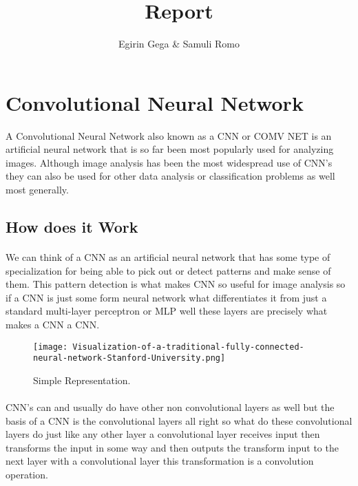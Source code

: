 \documentclass{article}
\title{Report}
\author{Egirin Gega \&  Samuli Romo}
\begin{document}
  \maketitle

  \newpage
  \tableofcontents
  \newpage
  \listoffigures
  \newpage
  \listoftables

  \newpage
  \section{Convolutional Neural Network}
  A Convolutional Neural Network also known as a CNN or COMV NET is an artificial neural network that is so far been most popularly used for analyzing images. Although image analysis has been the most widespread use of CNN's they can also be used for other data analysis or classification problems as well most generally.
  \subsection{How does it Work}
    \paragraph{}
    We can think of a CNN as an artificial neural network that has some type of specialization for being able to pick out or detect patterns and make sense of them. This pattern detection is what makes CNN so useful for image analysis so if a CNN is just some form  neural network what differentiates it from just a standard multi-layer perceptron or MLP well  these layers are precisely what makes a CNN a CNN.
    \begin{figure}[h!]
      \begin{center}
        \texttt{[image: Visualization-of-a-traditional-fully-connected-neural-network-Stanford-University.png]}
        \caption{Simple Representation.}
        \label{fig:snn}
      \end{center}
    \end{figure}
    \paragraph{}
    CNN's can and usually do have other non convolutional layers as well but the basis of a CNN is the convolutional layers all right so what do these convolutional layers do just like any other layer a convolutional layer receives input then transforms the input in some way and then outputs the transform input to the next layer with a convolutional layer this transformation is a convolution operation.
\end{document}

